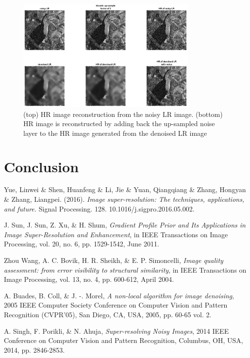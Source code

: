 \documentclass[a4paper,11pt]{article}
\begin{document}
\begin{figure}[H]
	\centering
	\includegraphics[width=0.8\textwidth]{simple denoise.png}
	\caption{(top) HR image reconstruction from the noisy LR image. (bottom) HR image is reconstructed by adding back the up-sampled noise layer to the HR image generated from the denoised LR image}
	\label{fig:sden}
\end{figure}

\section{Conclusion}


\begin{thebibliography}{10}

 {\sc Yue, Linwei \& Shen, Huanfeng \& Li, Jie \& Yuan, Qiangqiang \& Zhang, Hongyan \& Zhang, Liangpei.} (2016). {\em Image super-resolution: The techniques, applications, and future.} Signal Processing. 128. 10.1016/j.sigpro.2016.05.002. 

 {\sc J. Sun, J. Sun, Z. Xu, \& H. Shum}, {\em Gradient Profile Prior and Its Applications in Image Super-Resolution and Enhancement}, in IEEE Transactions on Image Processing, vol. 20, no. 6, pp. 1529-1542, June 2011.

 {\sc Zhou Wang, A. C. Bovik, H. R. Sheikh, \& E. P. Simoncelli}, {\em Image quality assessment: from error visibility to structural similarity}, in IEEE Transactions on Image Processing, vol. 13, no. 4, pp. 600-612, April 2004.

 {\sc A. Buades, B. Coll, \& J. -. Morel}, {\em A non-local algorithm for image denoising}, 2005 IEEE Computer Society Conference on Computer Vision and Pattern Recognition (CVPR'05), San Diego, CA, USA, 2005, pp. 60-65 vol. 2.

 {\sc A. Singh, F. Porikli, \& N. Ahuja}, {\em Super-resolving Noisy Images}, 2014 IEEE Conference on Computer Vision and Pattern Recognition, Columbus, OH, USA, 2014, pp. 2846-2853.

\end{thebibliography}
\end{document}
